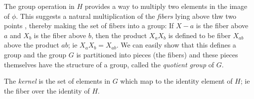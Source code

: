 The group operation in $H$ provides a way to multiply two elements in the image of $\phi$. This suggests a natural multiplication of the \emph{fibers} lying above thw two points , thereby making the set of fibers into a group: If $X-a$ is the fiber above $a$ and $X_b$ is the fiber above $b$, then the product $X_a X_b$ is defined to be fiber $X_{ab}$ above the product $ab$; ie $X_a X_b = X_{ab}$. We can easily show that this defines a group and the group $G$ is partitioned into pieces (the fibers) and these pieces themselves have the structure of a group, called the \emph{quotient group} of $G$.

The \emph{kernel} is the set of elements in $G$ which map to the identity element of $H$; ie the fiber over the identity of $H$.



